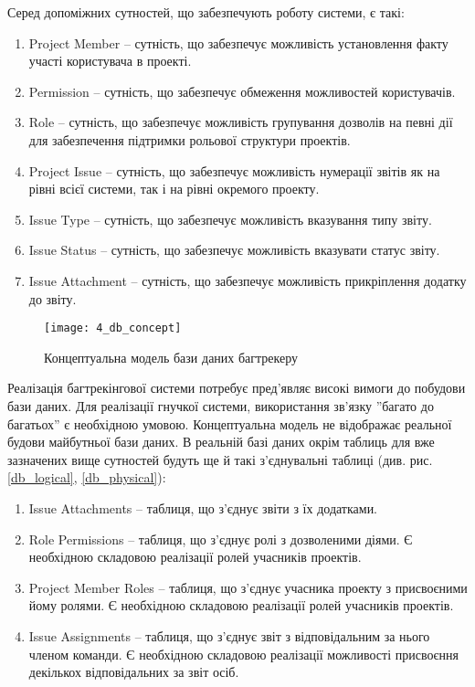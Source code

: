 \documentclass[../main.tex]{subfiles}
\begin{document}
		Серед допоміжних сутностей, що забезпечують роботу системи, є такі:
		\begin{enumerate}
			\item Project Member -- сутність, що забезпечує можливість установлення факту участі користувача в проекті.
			\item Permission -- сутність, що забезпечує обмеження можливостей користувачів.
			\item Role -- сутність, що забезпечує можливість групування дозволів на певні дії для забезпечення підтримки рольової структури проектів.
			\item Project Issue -- сутність, що забезпечує можливість нумерації звітів як на рівні всієї системи, так і на рівні окремого проекту.
			\item Issue Type -- сутність, що забезпечує можливість вказування типу звіту.
			\item Issue Status -- сутність, що забезпечує можливість вказувати статус звіту.
			\item Issue Attachment -- сутність, що забезпечує можливість прикріплення додатку до звіту.
		\end{enumerate}
		
		\begin{figure}[H]
			\centering
			\texttt{[image: 4\_db\_concept]}
			\caption{Концептуальна модель бази даних багтрекеру}
			\label{db_concept}
		\end{figure}
		
		Реалізація багтрекінгової системи потребує пред'являє високі вимоги до побудови бази даних. Для реалізації гнучкої системи, використання зв'язку ''багато до багатьох'' є необхідною умовою. Концептуальна модель не відображає реальної будови майбутньої бази даних. В реальній базі даних окрім таблиць для вже зазначених вище сутностей будуть ще й такі з'єднувальні таблиці (див. рис. \ref{db_logical}, \ref{db_physical}):
		
		\begin{enumerate}
			\item Issue Attachments -- таблиця, що з'єднує звіти з їх додатками.
			\item Role Permissions -- таблиця, що з'єднує ролі з дозволеними діями. Є необхідною складовою реалізації ролей учасників проектів.
			\item Project Member Roles -- таблиця, що з'єднує учасника проекту з присвоєними йому ролями. Є необхідною складовою реалізації ролей учасників проектів.
			\item Issue Assignments -- таблиця, що з'єднує звіт з відповідальним за нього членом команди. Є необхідною складовою реалізації можливості присвоєння декількох відповідальних за звіт осіб.
		\end{enumerate}
		
\end{document}
